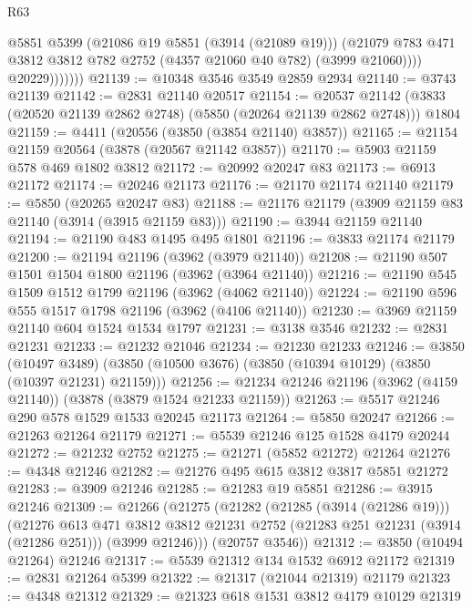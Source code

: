 \begin{lexlean}{R63}
\begin{coremodule}
                      @5851
                      @5399
                      (@21086 @19 @5851 (@3914 (@21089 @19)))
                      (@21079
                        @783
                        @471
                        @3812
                        @3812
                        @782
                        @2752
                        (@4357 @21060 @40 @782)
                        (@3999 @21060))))
                  @20229)))))))
@21139 := @10348 @3546 @3549 @2859 @2934
@21140 := @3743 @21139
@21142 := @2831 @21140 @20517
@21154 := @20537
    @21142
    (@3833 (@20520 @21139 @2862 @2748) (@5850 (@20264 @21139 @2862 @2748)))
    @1804
@21159 := @4411 (@20556 (@3850 (@3854 @21140) @3857))
@21165 := @21154 @21159 @20564 (@3878 (@20567 @21142 @3857))
@21170 := @5903 @21159 @578 @469 @1802 @3812
@21172 := @20992 @20247 @83
@21173 := @6913 @21172
@21174 := @20246 @21173
@21176 := @21170 @21174 @21140
@21179 := @5850 (@20265 @20247 @83)
@21188 := @21176 @21179 (@3909 @21159 @83 @21140 (@3914 (@3915 @21159 @83)))
@21190 := @3944 @21159 @21140
@21194 := @21190 @483 @1495 @495 @1801
@21196 := @3833 @21174 @21179
@21200 := @21194 @21196 (@3962 (@3979 @21140))
@21208 := @21190 @507 @1501 @1504 @1800 @21196 (@3962 (@3964 @21140))
@21216 := @21190 @545 @1509 @1512 @1799 @21196 (@3962 (@4062 @21140))
@21224 := @21190 @596 @555 @1517 @1798 @21196 (@3962 (@4106 @21140))
@21230 := @3969 @21159 @21140 @604 @1524 @1534 @1797
@21231 := @3138 @3546
@21232 := @2831 @21231
@21233 := @21232 @21046
@21234 := @21230 @21233
@21246 := @3850
    (@10497 @3489)
    (@3850 (@10500 @3676) (@3850 (@10394 @10129) (@3850 (@10397 @21231) @21159)))
@21256 := @21234 @21246 @21196 (@3962 (@4159 @21140)) (@3878 (@3879 @1524 @21233 @21159))
@21263 := @5517 @21246 @290 @578 @1529 @1533 @20245 @21173
@21264 := @5850 @20247
@21266 := @21263 @21264 @21179
@21271 := @5539 @21246 @125 @1528 @4179 @20244
@21272 := @21232 @2752
@21275 := @21271 (@5852 @21272) @21264
@21276 := @4348 @21246
@21282 := @21276 @495 @615 @3812 @3817 @5851 @21272
@21283 := @3909 @21246
@21285 := @21283 @19 @5851
@21286 := @3915 @21246
@21309 := @21266
    (@21275
      (@21282
        (@21285 (@3914 (@21286 @19)))
        (@21276
          @613
          @471
          @3812
          @3812
          @21231
          @2752
          (@21283 @251 @21231 (@3914 (@21286 @251)))
          (@3999 @21246)))
      (@20757 @3546))
@21312 := @3850 (@10494 @21264) @21246
@21317 := @5539 @21312 @134 @1532 @6912 @21172
@21319 := @2831 @21264 @5399
@21322 := @21317 (@21044 @21319) @21179
@21323 := @4348 @21312
@21329 := @21323 @618 @1531 @3812 @4179 @10129 @21319

\end{coremodule}
\end{lexlean}
